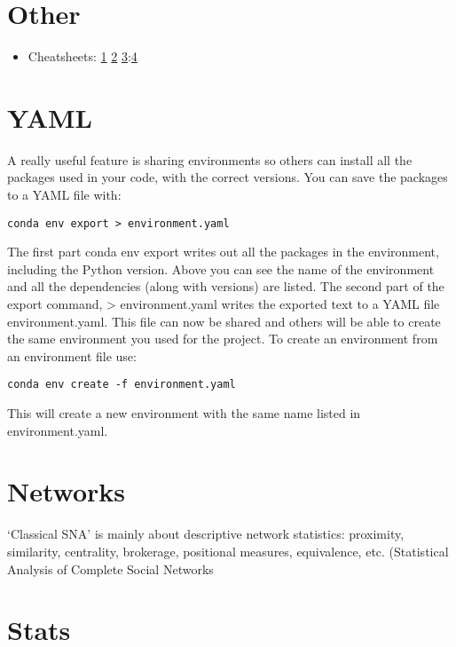 \documentclass[]{book}
\providecommand{\tightlist}{%
  \setlength{\itemsep}{0pt}\setlength{\parskip}{0pt}}
\theoremstyle{definition}
\theoremstyle{definition}
\theoremstyle{definition}
\theoremstyle{remark}
\begin{document}
\section{Other}\label{other-3}

\begin{itemize}
\tightlist
\item
  Cheatsheets:
  \href{https://startupsventurecapital.com/essential-cheat-sheets-for-machine-learning-and-deep-learning-researchers-efb6a8ebd2e5}{1}
  \textbar{} \href{https://github.com/kailashahirwar/cheatsheets-ai}{2}
  \textbar{}
  \href{https://github.com/juliangaal/python-cheat-sheet}{3}:\href{http://www.datasciencefree.com/cheatsheets.html}{4}
\end{itemize}

\section{YAML}\label{yaml}

A really useful feature is sharing environments so others can install
all the packages used in your code, with the correct versions. You can
save the packages to a YAML file with:

\texttt{conda\ env\ export\ \textgreater{}\ environment.yaml}

The first part conda env export writes out all the packages in the
environment, including the Python version. Above you can see the name of
the environment and all the dependencies (along with versions) are
listed. The second part of the export command, \textgreater{}
environment.yaml writes the exported text to a YAML file
environment.yaml. This file can now be shared and others will be able to
create the same environment you used for the project. To create an
environment from an environment file use:

\texttt{conda\ env\ create\ -f\ environment.yaml}

This will create a new environment with the same name listed in
environment.yaml.

\section{Networks}\label{networks}

`Classical SNA' is mainly about descriptive network statistics:
proximity, similarity, centrality, brokerage, positional measures,
equivalence, etc. (Statistical Analysis of Complete Social Networks

\section{Stats}\label{stats}
\end{document}
